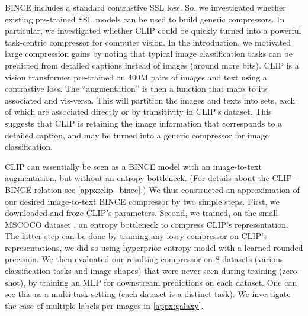 \documentclass[final]{article}
\begin{document}
BINCE includes a standard contrastive SSL loss. So, we investigated whether existing pre-trained SSL models \cite{chen_simple_2020,radford_learning_2021} can be used to build generic compressors. 
In particular, we investigated whether CLIP \cite{radford_learning_2021} could be quickly turned into a powerful task-centric compressor for computer vision.
In the introduction, we motivated large compression gains by noting that typical image classification tasks can be predicted from detailed captions instead of images (around  more bits). 
CLIP is a vision transformer \cite{dosovitskiy_image_2020} pre-trained on 400M pairs of images and text  using a contrastive loss.
The ``augmentation''  is then a function that maps  to its associated  and vis-versa. This will partition the images and texts into sets, each of which are associated directly or by transitivity in CLIP's dataset.
This suggests that CLIP is retaining the image information that corresponds to a detailed caption, and may be turned into a generic compressor for image classification.




CLIP can essentially be seen as a BINCE model with an image-to-text augmentation, but without an entropy bottleneck.
(For details about the CLIP-BINCE relation see \cref{appx:clip_bince}.)
We thus constructed an approximation of our desired image-to-text BINCE compressor by two simple steps.
First, we downloaded and froze CLIP's parameters. Second, we trained, on the small MSCOCO dataset \cite{lin_microsoft_2015}, an entropy bottleneck to compress CLIP's representation.
The latter step can be done by training any lossy compressor on CLIP's representations, we did so using  hyperprior entropy model with a learned rounded precision.
We then evaluated our resulting compressor on 8 datasets (various classification tasks and image shapes) that were never seen during training (zero-shot), by training an MLP for downstream predictions on each dataset.
One can see this as a multi-task setting (each dataset is a distinct task). We investigate the case of multiple labels per images in \cref{appx:galaxy}.
\end{document}
